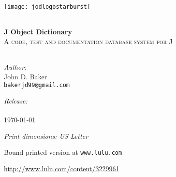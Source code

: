 \begin{titlepage}
 
\begin{center}
 
 
\texttt{[image: jodlogostarburst]}
  
 
\HRule \\[1.2cm]

{ \huge \bfseries J Object Dictionary}\\[0.4cm]

\textsc{A code, test and documentation database system for J}\\[0.5cm]
 
\HRule \\[1.2cm]
 
 
\begin{minipage}{0.4\textwidth}
\begin{flushleft}
\emph{Author:}\\
John D. Baker \\
\texttt{bakerjd99@gmail.com} \\
\end{flushleft}
\end{minipage}
\begin{minipage}{0.4\textwidth}
\begin{flushright}
\emph{Release:}\\
\jodversion \\
\today \\
\end{flushright}
\end{minipage}

\vspace{0.8cm}

\emph{Print dimensions: US Letter}

Bound printed version at \texttt{www.lulu.com}

\href{http://www.lulu.com/content/3229961}{http://www.lulu.com/content/3229961}


\end{center}
\end{titlepage}
